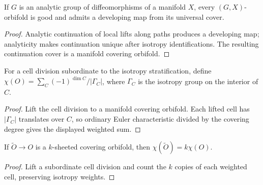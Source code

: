 \begin{proposition}
\label{thurston-ch13-analytic-good}

If $G$ is an analytic group of diffeomorphisms of a manifold $X$, every
$(G,X)$-orbifold is good and admits a developing map from its universal cover.
\end{proposition}
\begin{proof}
\sketch Analytic continuation of local lifts along paths produces a developing
map; analyticity makes continuation unique after isotropy identifications.
The resulting continuation cover is a manifold covering orbifold.
\end{proof}

\begin{definition}
\label{thurston-ch13-orbifold-euler}

For a cell division subordinate to the isotropy stratification, define
$\chi(O)=\sum_C(-1)^{\dim C}/|\Gamma_C|$, where $\Gamma_C$ is the isotropy
group on the interior of $C$.
\end{definition}
\begin{proof}
\sketch Lift the cell division to a manifold covering orbifold.  Each lifted
cell has $|\Gamma_C|$ translates over $C$, so ordinary Euler characteristic
divided by the covering degree gives the displayed weighted sum.
\end{proof}

\begin{proposition}
\label{thurston-ch13-euler-cover}

If $\widetilde O\to O$ is a $k$-sheeted covering orbifold, then
$\chi(\widetilde O)=k\chi(O)$.
\end{proposition}
\begin{proof}
\sketch Lift a subordinate cell division and count the $k$ copies of each
weighted cell, preserving isotropy weights.
\end{proof}

